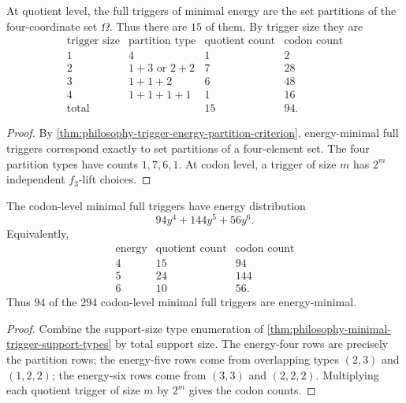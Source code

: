 \begin{theorem}
\label{thm:philosophy-energy-minimal-trigger-counts}
At quotient level, the full triggers of minimal energy are the set
partitions of the four-coordinate set $\Omega$. Thus there are $15$ of
them. By trigger size they are
$$
\begin{array}{c|l|r|r}
  \text{trigger size} & \text{partition type} & \text{quotient count} & \text{codon count}\\
  \hline
  1 & 4 & 1 & 2\\
  2 & 1+3\text{ or }2+2 & 7 & 28\\
  3 & 1+1+2 & 6 & 48\\
  4 & 1+1+1+1 & 1 & 16\\
  \hline
  \text{total} & & 15 & 94.
\end{array}
$$
\end{theorem}
\begin{proof}
By \autoref{thm:philosophy-trigger-energy-partition-criterion},
energy-minimal full triggers correspond exactly to set partitions of a
four-element set. The four partition types have counts
$1,7,6,1$. At codon level, a trigger of size $m$ has $2^{m}$
independent $f_{3}$-lift choices.
\end{proof}

\begin{theorem}
\label{thm:philosophy-minimal-triggers-by-energy}
The codon-level minimal full triggers have energy distribution
$$
  94y^{4}+144y^{5}+56y^{6}.
$$
Equivalently,
$$
\begin{array}{c|r|r}
  \text{energy} & \text{quotient count} & \text{codon count}\\
  \hline
  4 & 15 & 94\\
  5 & 24 & 144\\
  6 & 10 & 56.
\end{array}
$$
Thus $94$ of the $294$ codon-level minimal full triggers are
energy-minimal.
\end{theorem}
\begin{proof}
Combine the support-size type enumeration of
\autoref{thm:philosophy-minimal-trigger-support-types} by total support
size. The energy-four rows are precisely the partition rows; the
energy-five rows come from overlapping types $(2,3)$ and $(1,2,2)$;
the energy-six rows come from $(3,3)$ and $(2,2,2)$. Multiplying each
quotient trigger of size $m$ by $2^{m}$ gives the codon counts.
\end{proof}

